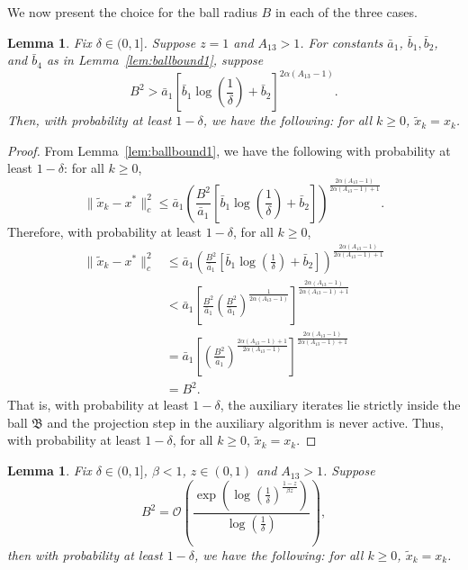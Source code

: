 \documentclass{article}
\newcommand{\lrp}[1]{\left( #1 \right)}
\newtheorem{lemma}[theorem]{Lemma}
\begin{document}
We now present the choice for the ball radius $B$ in each of the three cases.

\begin{lemma}\label{lem:ballradius1}
    Fix $\delta\in(0,1]$. Suppose $z = 1$ and $A_{13} > 1$. For constants $\bar{a}_1$, $\bar{b}_1, \bar{b}_2$, and $\bar{b}_4$ as in Lemma~\ref{lem:ballbound1}, suppose 
    \[ B^2 > \bar{a}_1 \left[\bar{b}_1\log\left(\frac{1}{\delta}\right) + \bar{b}_2  \right]^{2\alpha (A_{13}-1)}. \]
    Then, with probability at least $1-\delta$, we have the following: for all $k\ge 0$, $\tilde{x}_k = x_k$.
\end{lemma}
\begin{proof}
From Lemma~\ref{lem:ballbound1}, we have the following with probability at least $1-\delta$: for all $k\ge 0$, 
\begin{equation}\label{eq:intersectionvalue}
 \|\tilde{x}_k - x^*\|^2_c 
\le \bar{a}_1 \lrp{\frac{B^2}{\bar{a}_1} \left[\bar{b}_1\log\left(\frac{1}{\delta}\right) + \bar{b}_2 \right]}^\frac{2\alpha (A_{13}-1)}{2\alpha (A_{13}-1) + 1}.
\end{equation}
Therefore, with probability at least $1-\delta$, for all $k\ge 0$,
\begin{align*}
    \|\tilde{x}_k - x^*\|^2_c &\leq \bar{a}_1 \lrp{\frac{B^2}{\bar{a}_1} \left[\bar{b}_1\log\left(\frac{1}{\delta}\right) + \bar{b}_2 \right] }^\frac{2\alpha (A_{13}-1)}{2\alpha (A_{13}-1) + 1} \\
    &< \bar{a}_1 \left[\frac{B^2}{\bar{a}_1} \left(\frac{B^2}{\bar{a}_1}\right)^\frac{1}{2\alpha (A_{13}-1)}\right]^\frac{2\alpha (A_{13}-1)}{2\alpha (A_{13}-1) + 1} \\
    &= \bar{a}_1 \left[ \left(\frac{B^2}{\bar{a}_1}\right)^\frac{2\alpha (A_{13}-1) + 1}{2\alpha( A_{13}-1)}\right]^\frac{2\alpha (A_{13}-1)}{2\alpha (A_{13}-1) + 1} \\
    &= B^2.
\end{align*}
That is, with probability at least $1-\delta$,  the auxiliary iterates lie strictly inside the ball $\mathfrak B$ and the projection step in the auxiliary algorithm is never active. Thus, with probability at least $1-\delta$, for all $k\ge 0$, $\tilde{x}_k = x_k$.
\end{proof}



\begin{lemma}\label{lem:ballradius2}
    Fix $\delta\in(0,1]$, $\beta < 1$, $z\in (0,1)$ and $A_{13}  > 1$. Suppose 
    \[ B^2 = \mathcal{O}\lrp{\frac{\exp\lrp{ \log\left(\frac{1}{\delta}\right)^\frac{1-z}{\beta z} }}{\log\left(\frac{1}{\delta}\right)}}, \]
    then with probability at least $1-\delta$, we have the following: for all $k\ge 0$, $\tilde{x}_k = x_k$.
\end{lemma}
\end{document}
